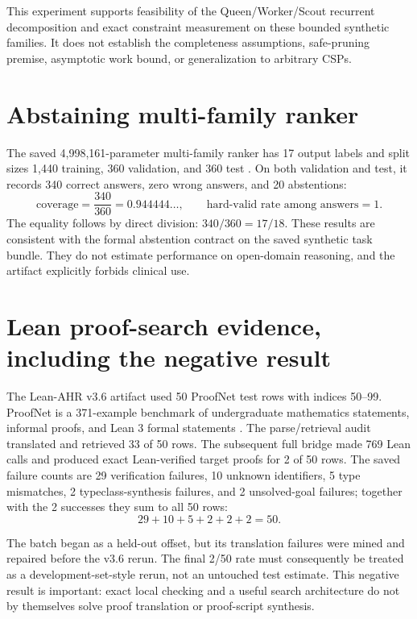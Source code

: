\documentclass[11pt,oneside]{book}
\theoremstyle{remark}
\begin{document}
This experiment supports feasibility of the Queen/Worker/Scout recurrent
decomposition and exact constraint measurement on these bounded synthetic
families. It does not establish the completeness assumptions, safe-pruning
premise, asymptotic work bound, or generalization to arbitrary CSPs.

\section{Abstaining multi-family ranker}

The saved 4,998,161-parameter multi-family ranker has 17 output labels and
split sizes 1,440 training, 360 validation, and 360 test
\cite{FalkenburgMultiFamilyRanker2026}. On both validation and test, it records
340 correct answers, zero wrong answers, and 20 abstentions:
\[
\text{coverage}=\frac{340}{360}=0.944444\ldots,
\qquad
\text{hard-valid rate among answers}=1.
\]
The equality follows by direct division: $340/360=17/18$. These results are
consistent with the formal abstention contract on the saved synthetic task
bundle. They do not estimate performance on open-domain reasoning, and the
artifact explicitly forbids clinical use.

\section{Lean proof-search evidence, including the negative result}

The Lean-AHR v3.6 artifact used 50 ProofNet test rows with indices 50--99.
ProofNet is a 371-example benchmark of undergraduate mathematics statements,
informal proofs, and Lean 3 formal statements
\cite{AzerbayevProofNet2023,FalkenburgLeanV36}. The parse/retrieval audit
translated and retrieved 33 of 50 rows. The subsequent full bridge made 769
Lean calls and produced exact Lean-verified target proofs for 2 of 50 rows.
The saved failure counts are 29 verification failures, 10 unknown identifiers,
5 type mismatches, 2 typeclass-synthesis failures, and 2 unsolved-goal
failures; together with the 2 successes they sum to all 50 rows:
\[
29+10+5+2+2+2=50.
\]

The batch began as a held-out offset, but its translation failures were mined
and repaired before the v3.6 rerun. The final 2/50 rate must consequently be
treated as a development-set-style rerun, not an untouched test estimate. This
negative result is important: exact local checking and a useful search
architecture do not by themselves solve proof translation or proof-script
synthesis.
\end{document}
